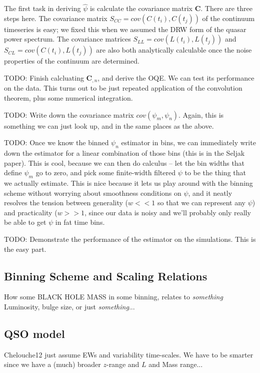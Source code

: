 \documentclass[11pt,a4paper]{article}
\begin{document}
The first task in deriving $\hat{\psi}$ is calculate the covariance
matrix $\mathbf{C}$. There are three steps here. The covariance matrix
$S_{CC}=cov\left(C(t_i),C(t_j)\right)$ of the continuum timeseries is
easy; we fixed this when we assumed the DRW form of the quasar power
spectrum. The covariance matrices
$S_{LL}=cov\left(L(t_i),L(t_j)\right)$ and
$S_{CL}=cov\left(C(t_i),L(t_j)\right)$ are also both analytically
calculable once the noise properties of the continuum are determined.

TODO: Finish calcluating $\mathbf{C}_{,n}$, and derive the OQE. We can
test its performance on the data. This turns out to be just repeated
application of the convolution theorem, plus some numerical
integration.

TODO: Write down the covariance matrix $cov\left(\psi_m,\psi_n\right)$.
Again, this is something we can just look up, and in the same places
as the above.

TODO: Once we know the binned $\psi_n$ estimator in bins, we can
immediately write down the estimator for a linear combination of those
bins (this is in the Seljak paper). This is cool, because we can then
do calculus -- let the bin widths that define $\psi_m$ go to zero, and
pick some finite-width filtered $\psi$ to be the thing that we
actually estimate. This is nice because it lets us play around with
the binning scheme without worrying about smoothness conditions on
$\psi$, and it neatly resolves the tension between generality ($w<<1$
so that we can represent any $\psi$) and practicality ($w>>1$, since
our data is noisy and we'll probably only really be able to get $\psi$
in fat time bins.

TODO: Demonstrate the performance of the estimator on the simulations.
This is the easy part.

    \subsection{Binning Scheme and Scaling Relations}
    How some BLACK HOLE MASS in some binning, relates to {\it something}
    Luminosity, bulge size, or just   {\it something}...
    

    \subsection{QSO model}
    Chelouche12 just assume EWs and variability time-scales. 
    We have to be smarter since we have a (much) broader $z$-range
    and $L$ and Mass range...
    
\end{document}
